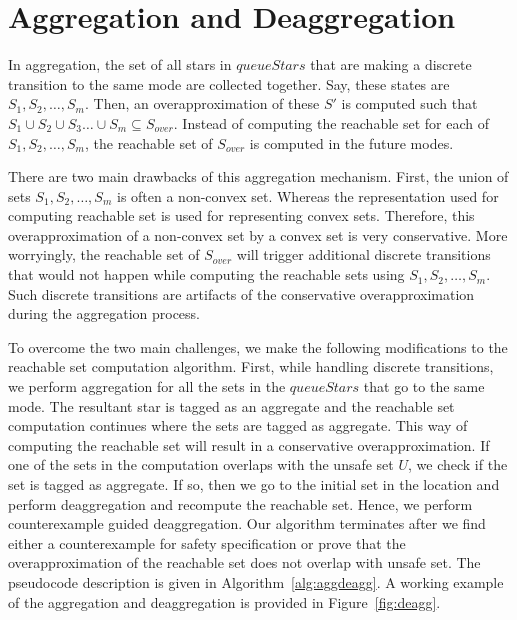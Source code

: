\section{Aggregation and Deaggregation}
\label{sec:agdag}

In aggregation, the set of all stars in $queueStars$ that are making a discrete transition to the same mode are collected together. 
%
Say, these states are $S_1, S_2, \ldots, S_m$.
%
Then, an overapproximation of these $S'$ is computed such that $S_1 \cup S_2 \cup S_3 \ldots \cup S_m \subseteq S_{over}$. 
%
Instead of computing the reachable set for each of $S_1, S_2, \ldots, S_m$, the reachable set of $S_{over}$ is computed in the future modes.

There are two main drawbacks of this aggregation mechanism. 
%
First, the union of sets $S_1, S_2, \ldots, S_m$ is often a non-convex set. 
%
Whereas the representation used for computing reachable set is used for representing convex sets. 
%
Therefore, this overapproximation of a non-convex set by a convex set is very conservative.
%
More worryingly, the reachable set of $S_{over}$ will trigger additional discrete transitions that would not happen while computing the reachable sets using $S_1, S_2, \ldots, S_m$.
%
Such discrete transitions are artifacts of the conservative overapproximation during the aggregation process.


To overcome the two main challenges, we make the following modifications to the reachable set computation algorithm.
First, while handling discrete transitions, we perform aggregation for all the sets in the $queueStars$ that go to the same mode. 
%
The resultant star is tagged as an \textsf{aggregate} and the reachable set computation continues where the sets are tagged as \textsf{aggregate}. 
%
This way of computing the reachable set will result in a conservative overapproximation.
%
If one of the sets in the computation overlaps with the unsafe set $U$, we check if the set is tagged as \textsf{aggregate}.
%
If so, then we go to the initial set in the location and perform deaggregation and recompute the reachable set.
%
Hence, we perform counterexample guided deaggregation.
%
Our algorithm terminates after we find either a counterexample for safety specification or prove that the overapproximation of the reachable set does not overlap with unsafe set. 
%
The pseudocode description is given in Algorithm~\ref{alg:aggdeagg}.
%
A working example of the aggregation and deaggregation is provided in Figure~\ref{fig:deagg}.


